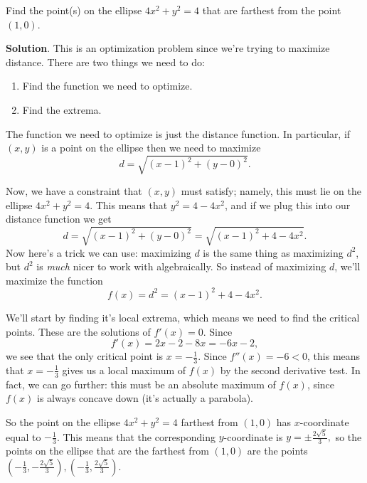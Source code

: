 \documentclass[10pt,]{book}
\theoremstyle{ptxplainnotitle}
\theoremstyle{ptxplaintitle}
\theoremstyle{ptxplainnotitle}
\theoremstyle{ptxplaintitle}
\theoremstyle{ptxplainnotitle}
\theoremstyle{ptxplaintitle}
\theoremstyle{ptxdefinitionnotitle}
\theoremstyle{ptxdefinitiontitle}
\theoremstyle{ptxdefinitionnotitle}
\theoremstyle{ptxdefinitiontitle}
\theoremstyle{ptxdefinitionnotitle}
\theoremstyle{ptxdefinitiontitle}
\theoremstyle{ptxdefinitionnotitle}
\theoremstyle{ptxdefinitiontitle}
\theoremstyle{ptxdefinitionnotitle}
\theoremstyle{ptxdefinitiontitle}
\numberwithin{equation}{section}
\begin{document}
\begin{example}\label{example-distance-on-an-ellipse}
\hypertarget{p-361}{}%
Find the point(s) on the ellipse \(4x^{2} + y^{2} = 4\) that are farthest from the point \((1,0)\).%
\par\smallskip%
\noindent\textbf{Solution}.\hypertarget{solution-80}{}\quad%
\hypertarget{p-362}{}%
This is an optimization problem since we're trying to maximize distance. There are two things we need to do: \leavevmode%
\begin{enumerate}
\item\hypertarget{li-26}{}Find the function we need to optimize.%
\item\hypertarget{li-27}{}Find the extrema.%
\end{enumerate}
 The function we need to optimize is just the distance function. In particular, if \((x,y)\) is a point on the ellipse then we need to maximize%
\begin{equation*}
d = \sqrt{(x-1)^{2} + (y-0)^{2}}.
\end{equation*}
%
\par
\hypertarget{p-363}{}%
Now, we have a constraint that \((x,y)\) must satisfy; namely, this must lie on the ellipse \(4x^{2} + y^{2} = 4\). This means that \(y^{2} = 4 - 4x^{2}\), and if we plug this into our distance function we get%
\begin{equation*}
d = \sqrt{(x-1)^{2} + (y-0)^{2}} = \sqrt{(x-1)^{2} + 4 - 4x^{2}}.
\end{equation*}
Now here's a trick we can use: maximizing \(d\) is the same thing as maximizing \(d^{2}\), but \(d^{2}\) is \emph{much} nicer to work with algebraically. So instead of maximizing \(d\), we'll maximize the function%
\begin{equation*}
f(x) = d^{2} = (x-1)^{2} + 4 - 4x^{2}.
\end{equation*}
%
\par
\hypertarget{p-364}{}%
We'll start by finding it's local extrema, which means we need to find the critical points. These are the solutions of \(f'(x) = 0\). Since%
\begin{equation*}
f'(x) = 2x - 2 - 8x = -6x - 2,
\end{equation*}
we see that the only critical point is \(x = -\frac{1}{3}\). Since \(f''(x) = -6 < 0\), this means that \(x = -\frac{1}{3}\) gives us a local maximum of \(f(x)\) by the second derivative test. In fact, we can go further: this must be an absolute maximum of \(f(x)\), since \(f(x)\) is always concave down (it's actually a parabola).%
\par
\hypertarget{p-365}{}%
So the point on the ellipse \(4x^{2} + y^{2} = 4\) farthest from \((1,0)\) has \(x\)-coordinate equal to \(-\frac{1}{3}\). This means that the corresponding \(y\)-coordinate is \(y = \pm\frac{2\sqrt{5}}{3},\) so the points on the ellipse that are the farthest from \((1,0)\) are the points \((-\frac{1}{3}, -\frac{2\sqrt{5}}{3}), (-\frac{1}{3}, \frac{2\sqrt{5}}{3}).\)%
\end{example}
\typeout{************************************************}
\typeout{************************************************}
\end{document}
